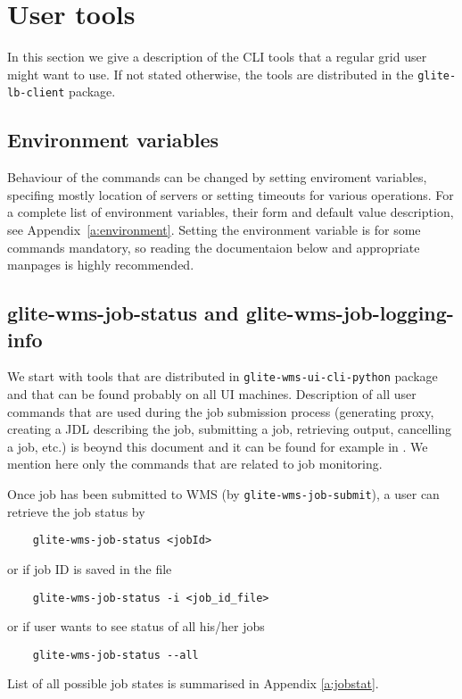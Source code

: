 \section{User tools}
\label{s:lb-tools}

In this section we give a description of the CLI tools that a regular grid user
might want to use. If not stated otherwise, the tools are distributed in the
\verb'glite-lb-client' package.

\subsection{Environment variables}

Behaviour of the commands can be changed by setting enviroment variables, specifing mostly
location of servers or setting timeouts for various operations. 
For a complete list of environment variables, their form and default value
description, see Appendix~\ref{a:environment}. Setting the environment variable
is for some commands mandatory, so reading the documentaion below and
appropriate manpages is highly recommended.


\subsection{glite-wms-job-status and glite-wms-job-logging-info}

We start with tools that are distributed in \verb'glite-wms-ui-cli-python' package
and that can be found probably on all UI machines. Description of all user
commands that are used during the job submission process (generating proxy,
creating a JDL describing the job, submitting a job, retrieving output,
cancelling a job, etc.) is beoynd this document and it can be found for example
in \cite{wmsug}. We mention here only the commands that are related to
job monitoring.

Once job has been submitted to WMS (by \verb'glite-wms-job-submit'), 
a user can retrieve the job status by
\begin{verbatim}
    glite-wms-job-status <jobId>
\end{verbatim}
or if job ID is saved in the file
\begin{verbatim}
    glite-wms-job-status -i <job_id_file>
\end{verbatim}
or if user wants to see status of all his/her jobs
\begin{verbatim}
    glite-wms-job-status --all
\end{verbatim}
List of all possible job states is summarised in Appendix \ref{a:jobstat}.

